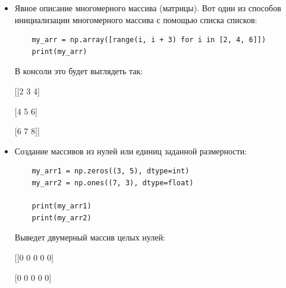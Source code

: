 \documentclass[pract]{SCWorks}
\begin{document}
\begin{itemize}
    \textbf{[1 4 2 5 3]}.
    
    С помощью функции \textbf{type()} можем убедиться, что тип созданного объекта \textbf{ndarray}.
    В консоли увидим: \textbf{<class 'numpy.ndarray'>}.
    
    Сразу рассмотрим пример создания многомерного массива из нескольких "листов": 
    
    Для каждого сотрудника компании существует список выплат базового оклада за последние 
    три месяца. Чтобы собрать всю информацию о зарплате в одну структуру данных, можно использовать 
    следующий код:

    \begin{verbatim}
    jeff_salary = [2700,3000,3000]
    nick_salary = [2600,2800,2800]
    tom_salary = [2300,2500,2500]
    base_salary = np.array([jeff_salary, nick_salary, tom_salary])
    print(base_salary)
    \end{verbatim}

    В консоли это будет выглядеть так:

    [[2700 3000 3000]

    [2600 2800 2800]

    [2300 2500 2500]]

    \item Явное описание многомерного массива (матрицы). Вот один из способов инициализации многомерного
    массива с помощью списка списков:

    \begin{verbatim}
    my_arr = np.array([range(i, i + 3) for i in [2, 4, 6]])
    print(my_arr)
    \end{verbatim}

    В консоли это будет выглядеть так:

    [[2 3 4]
    
    [4 5 6]
    
    [6 7 8]]

    \item Создание массивов из нулей или единиц заданной размерности:
    \begin{verbatim}
    my_arr1 = np.zeros((3, 5), dtype=int)
    my_arr2 = np.ones((7, 3), dtype=float)

    print(my_arr1)
    print(my_arr2)
    \end{verbatim}

    Выведет двумерный массив целых нулей:

    [[0 0 0 0 0]
    
    [0 0 0 0 0]
    

\end{itemize}
\end{document}
